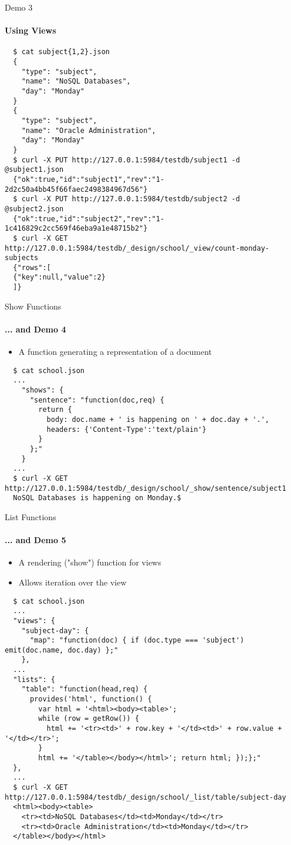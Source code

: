 \documentclass{beamer}
\begin{document}
\begin{frame}[fragile]{Demo 3}
  \framesubtitle{Using Views}
  \fontsize{6}{8}\selectfont
  \begin{verbatim}
  $ cat subject{1,2}.json 
  {
    "type": "subject",
    "name": "NoSQL Databases",
    "day": "Monday"
  }
  {
    "type": "subject",
    "name": "Oracle Administration",
    "day": "Monday"
  }
  $ curl -X PUT http://127.0.0.1:5984/testdb/subject1 -d @subject1.json
  {"ok":true,"id":"subject1","rev":"1-2d2c50a4bb45f66faec2498384967d56"}
  $ curl -X PUT http://127.0.0.1:5984/testdb/subject2 -d @subject2.json
  {"ok":true,"id":"subject2","rev":"1-1c416829c2cc569f46eba9a1e48715b2"}
  $ curl -X GET http://127.0.0.1:5984/testdb/_design/school/_view/count-monday-subjects
  {"rows":[
  {"key":null,"value":2}
  ]}
  \end{verbatim}
\end{frame}

\begin{frame}[fragile]{Show Functions}
  \framesubtitle{... and Demo 4}
  \begin{itemize}
    \item A function generating a representation of a document
  \end{itemize}
  \fontsize{6}{8}\selectfont
  \begin{verbatim}
  $ cat school.json
  ...
    "shows": {
      "sentence": "function(doc,req) { 
        return {
          body: doc.name + ' is happening on ' + doc.day + '.',
          headers: {'Content-Type':'text/plain'}
        }
      };"
    }
  ...
  $ curl -X GET http://127.0.0.1:5984/testdb/_design/school/_show/sentence/subject1
  NoSQL Databases is happening on Monday.$
  \end{verbatim}
\end{frame}

\begin{frame}[fragile]{List Functions}
  \framesubtitle{... and Demo 5}
  \begin{itemize}
    \item A rendering ("show") function for views
    \item Allows iteration over the view
  \end{itemize}
  \fontsize{6}{8}\selectfont
  \begin{verbatim}
  $ cat school.json
  ...
  "views": {
    "subject-day": {
      "map": "function(doc) { if (doc.type === 'subject') emit(doc.name, doc.day) };"	
    },
  ...
  "lists": {
    "table": "function(head,req) {
      provides('html', function() {
        var html = '<html><body><table>';
        while (row = getRow()) {
          html += '<tr><td>' + row.key + '</td><td>' + row.value + '</td></tr>';
        }
        html += '</table></body></html>'; return html; });};"
  },
  ...
  $ curl -X GET http://127.0.0.1:5984/testdb/_design/school/_list/table/subject-day
  <html><body><table>
    <tr><td>NoSQL Databases</td><td>Monday</td></tr>
    <tr><td>Oracle Administration</td><td>Monday</td></tr>
  </table></body></html>
  \end{verbatim}
\end{frame}
\end{document}
